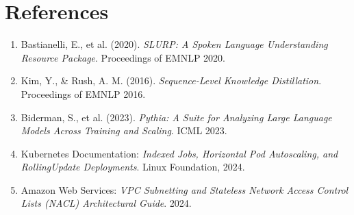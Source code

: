 \documentclass[10pt,a4paper]{article}
\begin{document}
\section*{References}
\begin{enumerate}[noitemsep,topsep=2pt,leftmargin=*]
    \item Bastianelli, E., et al. (2020). \textit{SLURP: A Spoken Language Understanding Resource Package}. Proceedings of EMNLP 2020.
    \item Kim, Y., \& Rush, A. M. (2016). \textit{Sequence-Level Knowledge Distillation}. Proceedings of EMNLP 2016.
    \item Biderman, S., et al. (2023). \textit{Pythia: A Suite for Analyzing Large Language Models Across Training and Scaling}. ICML 2023.
    \item Kubernetes Documentation: \textit{Indexed Jobs, Horizontal Pod Autoscaling, and RollingUpdate Deployments}. Linux Foundation, 2024.
    \item Amazon Web Services: \textit{VPC Subnetting and Stateless Network Access Control Lists (NACL) Architectural Guide}. 2024.
\end{enumerate}
\end{document}
